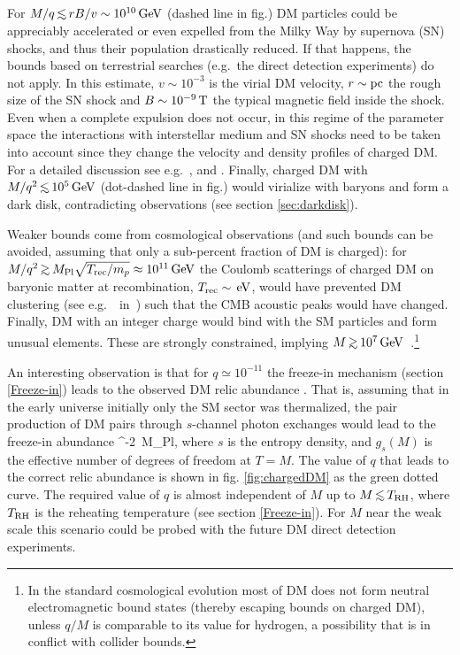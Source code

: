 For $M/q \circa{<} r B /v \sim 10^{10}\GeV$
(dashed line in fig.) 
DM particles could be appreciably accelerated or even expelled from the Milky Way
by supernova (SN) shocks, and thus their population drastically reduced. If that happens, the bounds based on terrestrial searches (e.g.~the direct detection experiments) do not apply. 
In this estimate, $v\sim 10^{-3}$ is the virial DM velocity, $r\sim {\rm pc}$ the rough size of the SN shock and  $B\sim 10^{-9}\,{\rm T}$ the typical magnetic field inside the shock. 
Even when a complete expulsion does not occur, in this regime of the parameter space the interactions with interstellar medium and SN shocks need to be taken into account since they change the velocity and density profiles of charged DM.
For a detailed discussion see e.g.~,  and .
Finally, charged DM with $M/q^2 \circa{<} 10^5 \GeV$  (dot-dashed line in fig.)
would virialize with baryons and form a dark disk, contradicting observations (see section \ref{sec:darkdisk}).


Weaker bounds come from cosmological observations (and such bounds can be avoided, assuming that only a sub-percent fraction of  DM is charged): for $M/q^2 \circa{>} M_{\rm Pl} \sqrt{T_{\rm rec}/m_p} \approx 10^{11}\GeV$ the
Coulomb scatterings of charged DM on baryonic matter at recombination, $T_{\rm rec}\sim \,{\rm eV}$, would have
prevented DM clustering (see e.g.\ \ in~\cite{CHAMP-exp})
such that the CMB acoustic peaks would have changed.
Finally, DM with an integer charge would bind with the SM particles and form unusual elements. These are strongly constrained,
implying $M \circa{>}10^7 \GeV$~\cite{CHAMP-exp}.\footnote{
In the standard cosmological evolution most of DM does not form neutral electromagnetic bound states (thereby escaping bounds on charged DM), 
unless $q/M$ is comparable to its value for hydrogen, a possibility that is in conflict with collider bounds.}

\medskip

An interesting observation is that for $q\simeq 10^{-11}$ the freeze-in mechanism (section \ref{Freeze-in}) leads to the observed DM relic abundance \cite{CHAMPFI}. 
That is, assuming that in the early universe initially only the SM sector was thermalized, the pair production of DM pairs through $s$-channel photon exchanges would lead to the freeze-in abundance
\beq\label{eq:freeze-in:CHAMP}
^{-2}\,  M_{\rm Pl},
\eeq
where $s$ is the entropy density, and $g_s(M)$ is the effective number of degrees of freedom at $T=M$. The value of $q$ that leads to the correct relic abundance is shown 
in fig. \ref{fig:chargedDM} as the green dotted curve. The required value of $q$ is almost independent of $M$ up to $M \circa{<} T_{\rm RH}$, where $T_{\rm RH}$ is the reheating temperature (see section \ref{Freeze-in}).
For $M$ near the weak scale this scenario could be probed with the future DM direct detection experiments.



